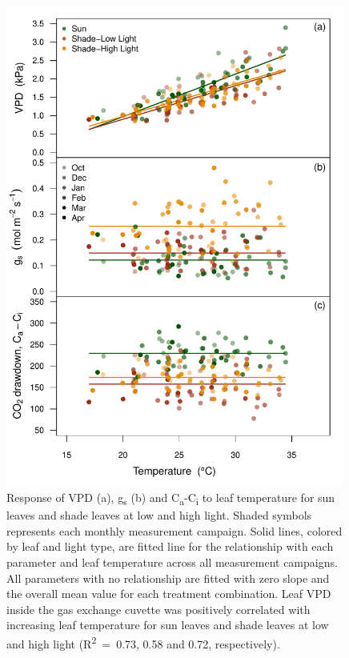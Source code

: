 \documentclass[a4paper]{article}\usepackage[]{graphicx}\usepackage[]{color}
\begin{document}
\begin{figure}[h!]
    \centering
    \includegraphics[width=0.99\textwidth]{gasex_temp4.pdf}
    \caption{Response of VPD (a), g\textsubscript{s} (b) and C\textsubscript{a}-C\textsubscript{i} to leaf temperature for sun leaves and shade leaves at low and high light. Shaded symbols represents each monthly measurement campaign. Solid lines, colored by leaf and light type, are fitted line for the relationship with each parameter and leaf temperature across all measurement campaigns. All parameters with no relationship are fitted with zero slope and the overall mean value for each treatment combination. Leaf VPD inside the gas exchange cuvette was positively correlated with increasing leaf temperature for sun leaves and shade leaves at low and high light (R\textsuperscript{2}~=~0.73, 0.58 and 0.72, respectively).}
    \label{fig:figure 3.S4}
\end{figure}
\end{document}
